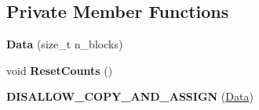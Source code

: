 \subsection*{Private Member Functions}
\begin{DoxyCompactItemize}
\item 
{\bfseries Data} (size\+\_\+t n\+\_\+blocks)\hypertarget{classv8_1_1internal_1_1_basic_block_profiler_1_1_data_a015829762d567df75e1b1ed7ed5cc386}{}\label{classv8_1_1internal_1_1_basic_block_profiler_1_1_data_a015829762d567df75e1b1ed7ed5cc386}

\item 
void {\bfseries Reset\+Counts} ()\hypertarget{classv8_1_1internal_1_1_basic_block_profiler_1_1_data_a04703f8cac4ef003b96ed832a625cc7f}{}\label{classv8_1_1internal_1_1_basic_block_profiler_1_1_data_a04703f8cac4ef003b96ed832a625cc7f}

\item 
{\bfseries D\+I\+S\+A\+L\+L\+O\+W\+\_\+\+C\+O\+P\+Y\+\_\+\+A\+N\+D\+\_\+\+A\+S\+S\+I\+GN} (\hyperlink{classv8_1_1internal_1_1_basic_block_profiler_1_1_data}{Data})\hypertarget{classv8_1_1internal_1_1_basic_block_profiler_1_1_data_a5ff2ea5c8b4e43f14e73a728ac9936fc}{}\label{classv8_1_1internal_1_1_basic_block_profiler_1_1_data_a5ff2ea5c8b4e43f14e73a728ac9936fc}

\end{DoxyCompactItemize}
